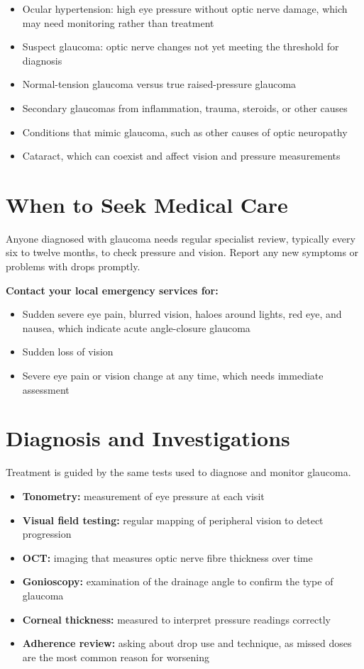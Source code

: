 \begin{itemize}
    \item Ocular hypertension: high eye pressure without optic nerve damage, which may need monitoring rather than treatment
    \item Suspect glaucoma: optic nerve changes not yet meeting the threshold for diagnosis
    \item Normal-tension glaucoma versus true raised-pressure glaucoma
    \item Secondary glaucomas from inflammation, trauma, steroids, or other causes
    \item Conditions that mimic glaucoma, such as other causes of optic neuropathy
    \item Cataract, which can coexist and affect vision and pressure measurements
\end{itemize}

\section*{When to Seek Medical Care}
Anyone diagnosed with glaucoma needs regular specialist review, typically every six to twelve months, to check pressure and vision. Report any new symptoms or problems with drops promptly.

\textbf{Contact your local emergency services for:}
\begin{itemize}
    \item Sudden severe eye pain, blurred vision, haloes around lights, red eye, and nausea, which indicate acute angle-closure glaucoma
    \item Sudden loss of vision
    \item Severe eye pain or vision change at any time, which needs immediate assessment
\end{itemize}

\section*{Diagnosis and Investigations}
Treatment is guided by the same tests used to diagnose and monitor glaucoma.

\begin{itemize}
    \item \textbf{Tonometry:} measurement of eye pressure at each visit
    \item \textbf{Visual field testing:} regular mapping of peripheral vision to detect progression
    \item \textbf{OCT:} imaging that measures optic nerve fibre thickness over time
    \item \textbf{Gonioscopy:} examination of the drainage angle to confirm the type of glaucoma
    \item \textbf{Corneal thickness:} measured to interpret pressure readings correctly
    \item \textbf{Adherence review:} asking about drop use and technique, as missed doses are the most common reason for worsening
\end{itemize}

